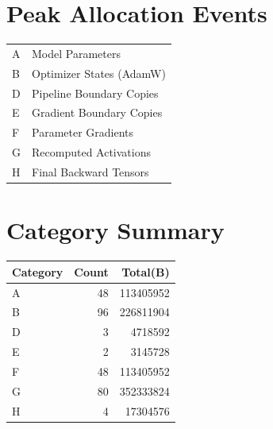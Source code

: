 \documentclass{article}
\begin{document}
\section*{Peak Allocation Events}
\small
\begin{tabular}{ll}
A & Model Parameters \\
B & Optimizer States (AdamW) \\
D & Pipeline Boundary Copies \\
E & Gradient Boundary Copies \\
F & Parameter Gradients \\
G & Recomputed Activations \\
H & Final Backward Tensors \\
\end{tabular}
\vspace{0.5em}
\section*{Category Summary}
\begin{tabular}{l r r}
Category & Count & Total(B) \\
\hline
A & 48 & 113405952 \\
B & 96 & 226811904 \\
D & 3 & 4718592 \\
E & 2 & 3145728 \\
F & 48 & 113405952 \\
G & 80 & 352333824 \\
H & 4 & 17304576 \\
\end{tabular}
\vspace{0.5em}
\end{document}
